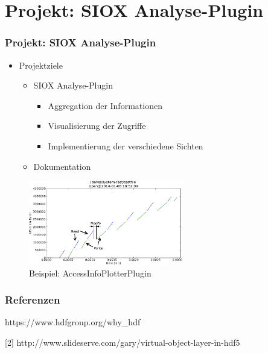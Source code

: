 \section{Projekt: SIOX Analyse-Plugin}
\begin{frame}
	\frametitle{Projekt: SIOX Analyse-Plugin}
	\begin{itemize}
		\item Projektziele
			\begin{itemize}
				\item SIOX Analyse-Plugin
					\begin{itemize}
						\item Aggregation der Informationen
						\item Visualisierung der Zugriffe
						\item Implementierung der verschiedene Sichten
					\end{itemize}
				\item Dokumentation
			\end{itemize}
	\end{itemize}
	\centering
	\begin{figure}
		\includegraphics[width=0.6\textwidth]{pictures/p1.png}
		\caption*{Beispiel: AccessInfoPlotterPlugin}
	\end{figure}
\end{frame}

\begin{frame}
	\frametitle{Referenzen}
	\begin{scriptsize}
[1] https://www.hdfgroup.org/why\_hdf

[2] http://www.slideserve.com/gary/virtual-object-layer-in-hdf5
	\end{scriptsize}
\end{frame}

